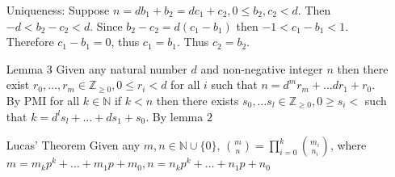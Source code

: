 \documentclass[12pt, letterpaper]{article}
\newcommand{\Z}{\mathbb{Z}}
\newcommand{\N}{\mathbb{N}}
\begin{document}
\begin{enumerate}
		Uniqueness:  Suppose $n = d b_1 + b_2 = d c_1 + c_2, 0 \leq b_2,c_2 < d$. Then $-d < b_2 - c_2 < d$.  Since $b_2 - c_2 = d (c_1 - b_1)$ then $-1 < c_1 - b_1 < 1$.  Therefore $c_1 - b_1 = 0$, thus $c_1 = b_1$.  Thus $c_2 = b_2$.  
		\item[Lemma 3] Given any natural number $d$ and non-negative integer $n$ then there exist $r_0,\ldots, r_m \in \Z_{\geq 0}, 0 \leq r_i < d$ for all $i$ such that $n = d^m r_m + \ldots d r_1 + r_0$.  \\
		
		By PMI for all $k \in \N$ if $k < n$ then there exists $s_0,\ldots s_l \in \Z_{\geq 0}, 0 \geq s_i < $ such that $k = d^l s_l + \ldots + d s_1 + s_0$.  By lemma $2$    \\
		
		\item[Lucas' Theorem] Given any $m,n \in \N \cup \{0\}$, $\binom{m}{n} = \prod_{i=0}^k \binom{m_i}{n_i}$, where $m = m_k p^k + \ldots + m_1 p + m_0, n = n_k p^k + \ldots + n_1 p + n_0$
	\end{enumerate}
\end{document}
